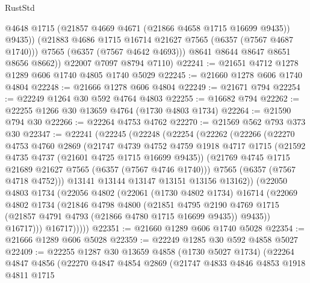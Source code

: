\begin{lexlean}{RustStd}
\begin{coremodule}
                @4648
                @1715
                (@21857 @4669 @4671 (@21866 @4658 @1715 @16699 @9435))
                @9435))
            (@21883 @4686 @1715 @16714 @21627 @7565 (@6357 (@7567 @4687 @1740)))
            @7565
            (@6357 (@7567 @4642 @4693)))
          @8641
          @8644
          @8647
          @8651
          @8656
          @8662))
      @22007
      @7097
      @8794
      @7110)
@22241 := @21651 @4712 @1278 @1289 @606 @1740 @4805 @1740 @5029
@22245 := @21660 @1278 @606 @1740 @4804
@22248 := @21666 @1278 @606 @4804
@22249 := @21671 @794
@22254 := @22249 @1264 @30 @592 @4764 @4803
@22255 := @16682 @794
@22262 := @22255 @1266 @30 @13659 @4764 (@1730 @4803 @1734)
@22264 := @21590 @794 @30
@22266 := @22264 @4753 @4762
@22270 := @21569 @562 @793 @373 @30
@22347 := @22241
    (@22245
      (@22248
        (@22254
          (@22262
            (@22266
              (@22270
                @4753
                @4760
                @2869
                (@21747
                  @4739
                  @4752
                  @4759
                  @1918
                  @4717
                  @1715
                  (@21592 @4735 @4737 (@21601 @4725 @1715 @16699 @9435))
                  (@21769 @4745 @1715 @21689 @21627 @7565 (@6357 (@7567 @4746 @1740)))
                  @7565
                  (@6357 (@7567 @4718 @4752)))
                @13141
                @13144
                @13147
                @13151
                @13156
                @13162))
            (@22050
              @4803
              @1734
              (@22056
                @4802
                (@22061
                  (@1730 @4802 @1734)
                  @16714
                  (@22069
                    @4802
                    @1734
                    (@21846
                      @4798
                      @4800
                      (@21851
                        @4795
                        @2190
                        @4769
                        @1715
                        (@21857 @4791 @4793 (@21866 @4780 @1715 @16699 @9435))
                        @9435))
                    @16717)))
              @16717)))))
@22351 := @21660 @1289 @606 @1740 @5028
@22354 := @21666 @1289 @606 @5028
@22359 := @22249 @1285 @30 @592 @4858 @5027
@22409 := @22255
    @1287
    @30
    @13659
    @4858
    (@1730 @5027 @1734)
    (@22264
      @4847
      @4856
      (@22270
        @4847
        @4854
        @2869
        (@21747
          @4833
          @4846
          @4853
          @1918
          @4811
          @1715

\end{coremodule}
\end{lexlean}
